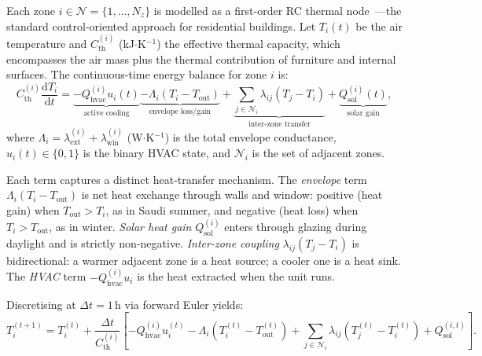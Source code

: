 \documentclass[12pt,a4paper]{article}
\newcommand{\Tout}{T_{\mathrm{out}}}
\newcommand{\Cth}{C_{\mathrm{th}}}
\newcommand{\lext}{\lambda_{\mathrm{ext}}}
\newcommand{\lwin}{\lambda_{\mathrm{win}}}
\newcommand{\lij}{\lambda_{ij}}
\newcommand{\Qhvac}{Q_{\mathrm{hvac}}}
\begin{document}
Each zone $i\in\mathcal{N}=\{1,\ldots,N_z\}$ is modelled as a first-order
RC thermal node~\cite{Drgoona2021,Wang2021RC,Deng2022}---the standard
control-oriented approach for residential buildings.
Let $T_i(t)$ be the air temperature and $\Cth^{(i)}$ (kJ$\cdot$K$^{-1}$)
the effective thermal capacity, which encompasses the air mass plus
the thermal contribution of furniture and internal surfaces.
The continuous-time energy balance for zone $i$ is:
\begin{equation}
  \Cth^{(i)}\frac{\mathrm{d}T_i}{\mathrm{d}t}
  =
  \underbrace{-\Qhvac^{(i)}u_i(t)}_{\text{active cooling}}
  \underbrace{-\Lambda_i\!\left(T_i-\Tout\right)}_{\text{envelope loss/gain}}
  +\underbrace{\sum_{j\in\mathcal{N}_i}\lij\!\left(T_j-T_i\right)}_{\text{inter-zone transfer}}
  +\underbrace{Q_{\mathrm{sol}}^{(i)}(t)}_{\text{solar gain}},
  \label{eq:rc_cont}
\end{equation}
where $\Lambda_i=\lext^{(i)}+\lwin^{(i)}$ (W$\cdot$K$^{-1}$) is the
total envelope conductance, $u_i(t)\in\{0,1\}$ is the binary HVAC state,
and $\mathcal{N}_i$ is the set of adjacent zones.

Each term captures a distinct heat-transfer mechanism.
The \emph{envelope} term $\Lambda_i(T_i-\Tout)$ is net heat exchange
through walls and window: positive (heat gain) when $\Tout>T_i$, as in
Saudi summer, and negative (heat loss) when $T_i>\Tout$, as in winter.
\emph{Solar heat gain} $Q_{\mathrm{sol}}^{(i)}$ enters through glazing
during daylight and is strictly non-negative.
\emph{Inter-zone coupling} $\lij(T_j-T_i)$ is bidirectional: a warmer
adjacent zone is a heat source; a cooler one is a heat sink.
The \emph{HVAC} term $-\Qhvac^{(i)}u_i$ is the heat extracted when
the unit runs.

Discretising at $\Delta t=1\,\text{h}$ via forward Euler yields:
\begin{equation}
  T_i^{(t+1)}=T_i^{(t)}
  +\frac{\Delta t}{\Cth^{(i)}}
  \!\left[
    -\Qhvac^{(i)}u_i^{(t)}
    -\Lambda_i\!\left(T_i^{(t)}-\Tout^{(t)}\right)
    +\sum_{j\in\mathcal{N}_i}\lij\!\left(T_j^{(t)}-T_i^{(t)}\right)
    +Q_{\mathrm{sol}}^{(i,t)}
  \right].
  \label{eq:rc_disc}
\end{equation}
\end{document}
